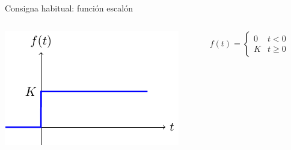 \documentclass[aspectratio=169, usenames,svgnames,dvipsnames]{beamer}
\begin{document}
\begin{frame}{Consigna habitual: \hspace{3mm}función escalón} \label{diapo:escalon}
    \begin{columns}
    \begin{column}{0.7\columnwidth}
        \begin{center}
            \includegraphics[width=.7\linewidth]{../figs/escalon.pdf}
        \end{center}
    \end{column}    
    \begin{column}{0.3\columnwidth}
    
        \vspace{6mm}
        
        $
            f(t) = %
            \begin{cases}
            0 & t < 0\\
            K & t \geq 0
            \end{cases}
        $
    \end{column}
    \end{columns}
\end{frame}

\end{document}
